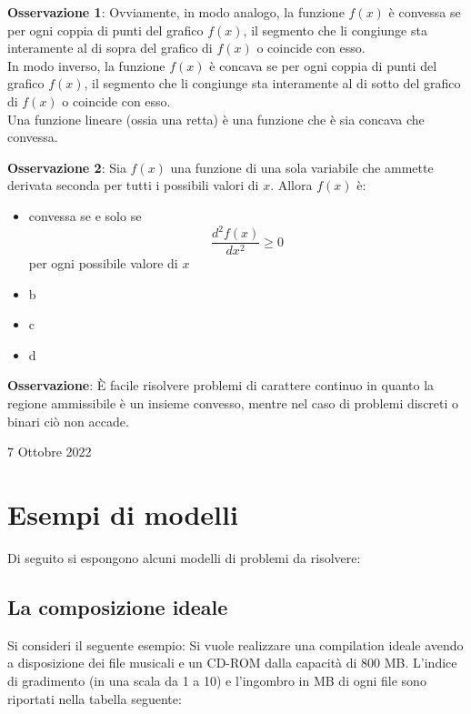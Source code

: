 \documentclass[a4paper]{extarticle}
\begin{document}
\vspace{2em}
\noindent
\textbf{Osservazione 1}: Ovviamente, in modo analogo, la funzione $f(x)$ è convessa se per ogni coppia di punti del grafico $f(x)$, il segmento che li congiunge sta interamente al di sopra del grafico di $f(x)$ o coincide con esso.\\
In modo inverso, la funzione $f(x)$ è concava se per ogni coppia di punti del grafico $f(x)$, il segmento che li congiunge sta interamente al di sotto del grafico di $f(x)$ o coincide con esso.\\
Una funzione lineare (ossia una retta) è una funzione che è sia concava che convessa.

\vspace{1em}
\noindent
\textbf{Osservazione 2}: Sia $f(x)$ una funzione di una sola variabile che ammette derivata seconda per tutti i possibili valori di $x$. Allora $f(x)$ è:
\begin{itemize}
    \item convessa se e solo se 
    \[\frac{d^2 f(x)}{dx^2} \geq 0\]
    per ogni possibile valore di $x$
    \item b
    \item c
    \item d
\end{itemize}

\vspace{1em}
\noindent
\textbf{Osservazione}: È facile risolvere problemi di carattere continuo in quanto la regione ammissibile è un insieme convesso, mentre nel caso di problemi discreti o binari ciò non accade.

\newpage
\begin{center}
    7 Ottobre 2022
\end{center}
\vspace{1em}
\noindent
\section{Esempi di modelli}
Di seguito si espongono alcuni modelli di problemi da risolvere:

\vspace{1em}
\noindent
\subsection{La composizione ideale}
Si consideri il seguente esempio: Si vuole realizzare una compilation ideale avendo a disposizione dei file musicali e un CD-ROM dalla capacità di 800 MB. L'indice di gradimento (in una scala da 1 a 10) e l'ingombro in MB di ogni file sono riportati nella tabella seguente:
\end{document}
